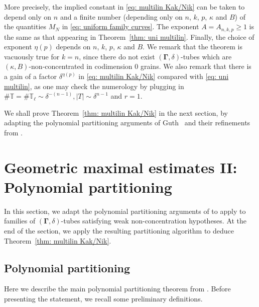 \documentclass[reqno]{amsart}
\numberwithin{equation}{section}
\newcommand{\T}{\mathbb{T}}
\newcommand{\bdGamma}{\boldsymbol{\Gamma}}
\theoremstyle{plain}
\theoremstyle{definition}
\begin{document}
More precisely, the implied constant in \eqref{eq: multilin Kak/Nik} can be taken to depend only on $n$ and a finite number (depending only on $n$, $k$, $p$, $\kappa$ and $B$) of the quantities $M_N$ in \eqref{eq: uniform family curves}. The exponent $A = A_{n,k,p} \geq 1$ is the same as that appearing in Theorem~\ref{thm: uni multilin}. Finally, the choice of exponent $\eta(p)$ depends on $n$, $k$, $p$, $\kappa$ and $B$. We remark that the theorem is vacuously true for $k=n$, since there do not exist $(\bdGamma, \delta)$-tubes which are $(\kappa, B)$-non-concentrated in codimension $0$ grains. We also remark that there is a gain of a factor $\delta^{\eta(p)}$ in \eqref{eq: multilin Kak/Nik} compared with \eqref{eq: uni multilin}, as one may check the numerology by plugging in $\#\T=\#\T_\ell\sim\delta^{-(n-1)}, |T|\sim\delta^{n-1}$ and $r=1$.

We shall prove Theorem~\ref{thm: multilin Kak/Nik} in the next section, by adapting the polynomial partitioning arguments of Guth~\cite{Guth2018} and their refinements from \cite{HRZ2022}. 





\section{Geometric maximal estimates II: Polynomial partitioning}\label{sec: partitioning}

In this section, we adapt the polynomial partitioning arguments of \cite{Guth2018, HRZ2022} to apply to families of $(\bdGamma, \delta)$-tubes satisfying weak non-concentration hypotheses. At the end of the section, we apply the resulting partitioning algorithm to deduce Theorem~\ref{thm: multilin Kak/Nik}.

 




\subsection{Polynomial partitioning} Here we describe the main polynomial partitioning theorem from \cite{Guth2018}. Before presenting the statement, we recall some preliminary definitions. 
\end{document}

